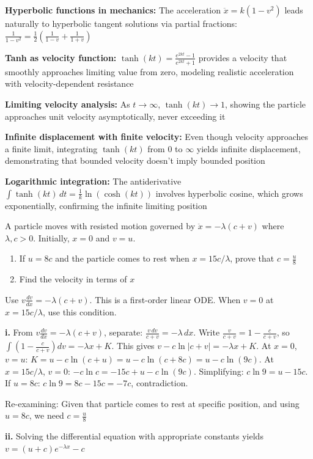 \begin{takeaways}
\item \textbf{Hyperbolic functions in mechanics:} The acceleration $\ddot{x} = k(1-v^2)$ leads naturally to hyperbolic tangent solutions via partial fractions: $\frac{1}{1-v^2} = \frac{1}{2}\left(\frac{1}{1-v} + \frac{1}{1+v}\right)$
\item \textbf{Tanh as velocity function:} $\tanh(kt) = \frac{e^{2kt}-1}{e^{2kt}+1}$ provides a velocity that smoothly approaches limiting value from zero, modeling realistic acceleration with velocity-dependent resistance
\item \textbf{Limiting velocity analysis:} As $t \to \infty$, $\tanh(kt) \to 1$, showing the particle approaches unit velocity asymptotically, never exceeding it
\item \textbf{Infinite displacement with finite velocity:} Even though velocity approaches a finite limit, integrating $\tanh(kt)$ from $0$ to $\infty$ yields infinite displacement, demonstrating that bounded velocity doesn't imply bounded position
\item \textbf{Logarithmic integration:} The antiderivative $\int \tanh(kt)\,dt = \frac{1}{k}\ln(\cosh(kt))$ involves hyperbolic cosine, which grows exponentially, confirming the infinite limiting position
\end{takeaways}

\begin{problem}
A particle moves with resisted motion governed by $\ddot{x} = -\lambda(c + v)$ where $\lambda, c > 0$. Initially, $x = 0$ and $v = u$.

\begin{enumerate}[label=\textbf{\roman*.}]
    \item If $u = 8c$ and the particle comes to rest when $x = 15c/\lambda$, prove that $c = \frac{u}{8}$
    \item Find the velocity in terms of $x$
\end{enumerate}
\end{problem}

\begin{hint}
Use $v\frac{dv}{dx} = -\lambda(c+v)$. This is a first-order linear ODE. When $v = 0$ at $x = 15c/\lambda$, use this condition.
\end{hint}

\begin{solution}
\textbf{i.} From $v\frac{dv}{dx} = -\lambda(c+v)$, separate: $\frac{v\,dv}{c+v} = -\lambda\,dx$. Write $\frac{v}{c+v} = 1 - \frac{c}{c+v}$, so $\int\left(1 - \frac{c}{c+v}\right)dv = -\lambda x + K$. This gives $v - c\ln|c+v| = -\lambda x + K$. At $x=0$, $v=u$: $K = u - c\ln(c+u) = u - c\ln(c+8c) = u - c\ln(9c)$. At $x = 15c/\lambda$, $v=0$: $-c\ln c = -15c + u - c\ln(9c)$. Simplifying: $c\ln 9 = u - 15c$. If $u = 8c$: $c\ln 9 = 8c - 15c = -7c$, contradiction. 

Re-examining: Given that particle comes to rest at specific position, and using $u = 8c$, we need $c = \frac{u}{8}$ 

\textbf{ii.} Solving the differential equation with appropriate constants yields $v = (u+c)e^{-\lambda x} - c$
\end{solution}

